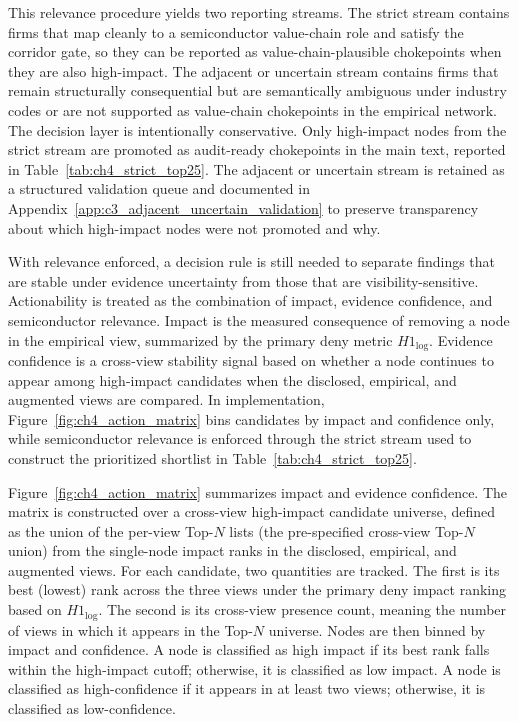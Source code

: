 This relevance procedure yields two reporting streams. The strict stream contains firms that map cleanly to a semiconductor value-chain role and satisfy the corridor gate, so they can be reported as value-chain-plausible chokepoints when they are also high-impact. The adjacent or uncertain stream contains firms that remain structurally consequential but are semantically ambiguous under industry codes or are not supported as value-chain chokepoints in the empirical network. The decision layer is intentionally conservative. Only high-impact nodes from the strict stream are promoted as audit-ready chokepoints in the main text, reported in Table~\ref{tab:ch4_strict_top25}. The adjacent or uncertain stream is retained as a structured validation queue and documented in Appendix~\ref{app:c3_adjacent_uncertain_validation} to preserve transparency about which high-impact nodes were not promoted and why.

With relevance enforced, a decision rule is still needed to separate findings that are stable under evidence uncertainty from those that are visibility-sensitive. Actionability is treated as the combination of impact, evidence confidence, and semiconductor relevance. Impact is the measured consequence of removing a node in the empirical view, summarized by the primary deny metric $H1_{\log}$. Evidence confidence is a cross-view stability signal based on whether a node continues to appear among high-impact candidates when the disclosed, empirical, and augmented views are compared. In implementation, Figure~\ref{fig:ch4_action_matrix} bins candidates by impact and confidence only, while semiconductor relevance is enforced through the strict stream used to construct the prioritized shortlist in Table~\ref{tab:ch4_strict_top25}.

Figure~\ref{fig:ch4_action_matrix} summarizes impact and evidence confidence. The matrix is constructed over a cross-view high-impact candidate universe, defined as the union of the per-view Top-$N$ lists (the pre-specified cross-view Top-$N$ union) from the single-node impact ranks in the disclosed, empirical, and augmented views. For each candidate, two quantities are tracked. The first is its best (lowest) rank across the three views under the primary deny impact ranking based on $H1_{\log}$. The second is its cross-view presence count, meaning the number of views in which it appears in the Top-$N$ universe. Nodes are then binned by impact and confidence. A node is classified as high impact if its best rank falls within the high-impact cutoff; otherwise, it is classified as low impact. A node is classified as high-confidence if it appears in at least two views; otherwise, it is classified as low-confidence.

